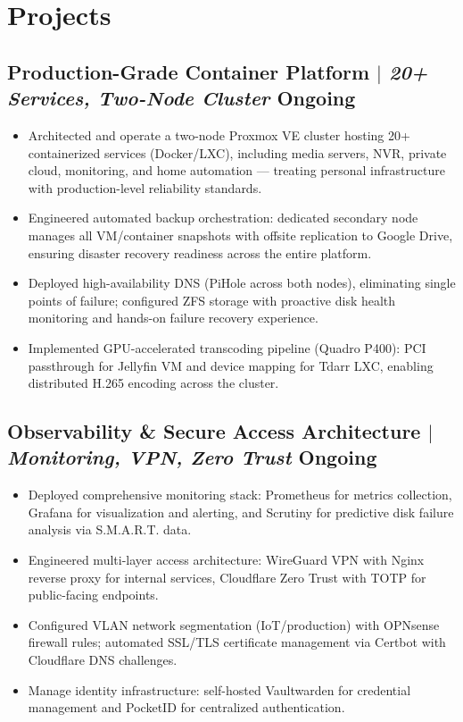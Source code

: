 \documentclass[10pt]{article}
\begin{document}
\section{Projects}
\subsection{Production-Grade Container Platform $|$ \normalfont\textit{20+ Services, Two-Node Cluster} \hfill Ongoing}
\begin{itemize}
	\item Architected and operate a two-node Proxmox VE cluster hosting 20+ containerized services (Docker/LXC), including media servers, NVR, private cloud, monitoring, and home automation --- treating personal infrastructure with production-level reliability standards.
	\item Engineered automated backup orchestration: dedicated secondary node manages all VM/container snapshots with offsite replication to Google Drive, ensuring disaster recovery readiness across the entire platform.
	\item Deployed high-availability DNS (PiHole across both nodes), eliminating single points of failure; configured ZFS storage with proactive disk health monitoring and hands-on failure recovery experience.
	\item Implemented GPU-accelerated transcoding pipeline (Quadro P400): PCI passthrough for Jellyfin VM and device mapping for Tdarr LXC, enabling distributed H.265 encoding across the cluster.
\end{itemize}

\subsection{Observability \& Secure Access Architecture $|$ \normalfont\textit{Monitoring, VPN, Zero Trust} \hfill Ongoing}
\begin{itemize}
	\item Deployed comprehensive monitoring stack: Prometheus for metrics collection, Grafana for visualization and alerting, and Scrutiny for predictive disk failure analysis via S.M.A.R.T. data.
	\item Engineered multi-layer access architecture: WireGuard VPN with Nginx reverse proxy for internal services, Cloudflare Zero Trust with TOTP for public-facing endpoints.
	\item Configured VLAN network segmentation (IoT/production) with OPNsense firewall rules; automated SSL/TLS certificate management via Certbot with Cloudflare DNS challenges.
	\item Manage identity infrastructure: self-hosted Vaultwarden for credential management and PocketID for centralized authentication.
\end{itemize}
\end{document}
